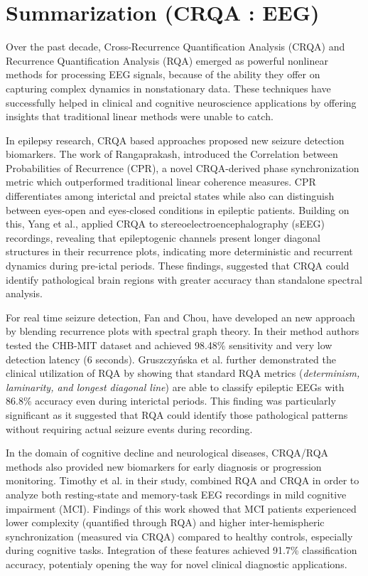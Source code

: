 \documentclass{article}
\begin{document}
	\section*{Summarization (CRQA : EEG)}
	
		Over the past decade, Cross-Recurrence Quantification Analysis (CRQA) and Recurrence Quantification Analysis (RQA) 
		emerged as powerful nonlinear methods for processing EEG signals, because of the ability they offer on capturing complex 
		dynamics in nonstationary data. These techniques have successfully helped in clinical and cognitive 
		neuroscience applications by offering insights that traditional linear methods were unable to catch.

		In epilepsy research, CRQA based approaches proposed new seizure detection biomarkers.
		The work of Rangaprakash\cite{rangaprakash2014}, introduced the Correlation between Probabilities of Recurrence (CPR), 
		a novel CRQA-derived phase synchronization metric which outperformed traditional linear coherence measures.
		CPR differentiates among interictal and preictal states while also can distinguish 
		between eyes-open and eyes-closed conditions in epileptic patients. 
		Building on this, Yang et al.\cite{yang2019dynamical}, applied CRQA to stereoelectroencephalography 
		(sEEG) recordings, revealing that epileptogenic channels present longer diagonal structures in their recurrence plots,
		indicating more deterministic and recurrent dynamics during pre-ictal periods. 
		These findings, suggested that CRQA could identify pathological brain regions with greater 
		accuracy than standalone spectral analysis.

		For real time seizure detection, Fan and Chou\cite{fan2019detecting}, have developed an
		new approach by blending recurrence plots with spectral graph theory. 
		In their method authors tested the CHB-MIT dataset and achieved  98.48\% sensitivity and very low detection latency (6 seconds). 
		Gruszczyńska et al.\cite{gruszczynska2019} further demonstrated the clinical utilization
		of RQA by showing that standard
		RQA metrics (\textit{determinism, laminarity, and longest diagonal line}) are able to classify 
		epileptic EEGs with 86.8\% accuracy even during interictal periods. 
		This finding was particularly significant as it suggested that RQA could identify those pathological patterns 
		without requiring actual seizure events during recording.

		In the domain of  cognitive decline and neurological diseases, CRQA/RQA methods also provided new 
		biomarkers for early diagnosis or progression monitoring.
		Timothy et al.\cite{timothy2017classification} in their study, combined RQA and CRQA in order to analyze both 
		resting-state and memory-task EEG recordings in mild cognitive impairment (MCI). 
		Findings of this work showed that MCI patients experienced lower complexity (quantified through RQA) 
		and higher inter-hemispheric synchronization (measured via CRQA) compared to healthy controls, especially 
		during cognitive tasks. 
		Integration of these features achieved 91.7\% classification accuracy, 
		potentialy opening the way for novel clinical diagnostic applications.
\end{document}
